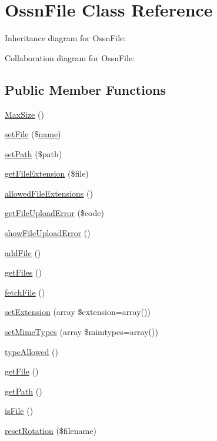 \hypertarget{class_ossn_file}{}\section{Ossn\+File Class Reference}
\label{class_ossn_file}


Inheritance diagram for Ossn\+File\+:


Collaboration diagram for Ossn\+File\+:
\subsection*{Public Member Functions}
\begin{DoxyCompactItemize}
\item 
\hyperlink{class_ossn_file_ad0c8e2f79771e4fbe112ea438d26812e}{Max\+Size} ()
\item 
\hyperlink{class_ossn_file_a65c08d70e77be0b3378e24f31a091c32}{set\+File} (\$\hyperlink{user_8php_a765af5e9671743530143a6d3670fd9a6}{name})
\item 
\hyperlink{class_ossn_file_a5d101758b135bd36ba8992cc3bb67a24}{set\+Path} (\$path)
\item 
\hyperlink{class_ossn_file_a42b916003160b0cd2fc57f7a590dbe4d}{get\+File\+Extension} (\$file)
\item 
\hyperlink{class_ossn_file_a64f65acc2e33d6c0e63502f1b4255043}{allowed\+File\+Extensions} ()
\item 
\hyperlink{class_ossn_file_a38d1f71721ea40a90c36771160796198}{get\+File\+Upload\+Error} (\$code)
\item 
\hyperlink{class_ossn_file_abab6b73456b8b7d1255cbfde29faeaae}{show\+File\+Upload\+Error} ()
\item 
\hyperlink{class_ossn_file_ad85961b5e9dc395643a4bf76f83c57d4}{add\+File} ()
\item 
\hyperlink{class_ossn_file_a7010e197d8dce475dfdd443c11dd7ee9}{get\+Files} ()
\item 
\hyperlink{class_ossn_file_a8185868ddd21ffa1015dd672d76de89f}{fetch\+File} ()
\item 
\hyperlink{class_ossn_file_a1bf20e252d370638ce4d0602ee65fd30}{set\+Extension} (array \$extension=array())
\item 
\hyperlink{class_ossn_file_ab97b87cddb79c9b58e346c7f8c1a9b7c}{set\+Mime\+Types} (array \$mimtypes=array())
\item 
\hyperlink{class_ossn_file_a6d952ae1125eb50a79ba4834759b4ae2}{type\+Allowed} ()
\item 
\hyperlink{class_ossn_file_adf61e733be7f62a3f4bedbe7d2e02ec2}{get\+File} ()
\item 
\hyperlink{class_ossn_file_a30c5c67b2bf8e2e2ccc7e361faa20afe}{get\+Path} ()
\item 
\hyperlink{class_ossn_file_a746fee70ac0f3dcd5543ff033dabbc97}{is\+File} ()
\item 
\hyperlink{class_ossn_file_a5400301ee671ad651916b1dad7362808}{reset\+Rotation} (\$filename)
\end{DoxyCompactItemize}
